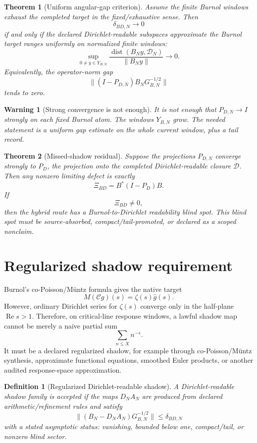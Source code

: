 \documentclass[11pt]{article}
\newtheorem{theorem}{Theorem}
\newtheorem{definition}{Definition}
\newtheorem{warning}{Warning}
\begin{document}
\begin{theorem}[Uniform angular-gap criterion]
Assume the finite Burnol windows exhaust the completed target in the fixed/exhaustive sense.  Then
\[
\delta_{BD,N}\to0
\]
if and only if the declared Dirichlet-readable subspaces approximate the Burnol target ranges uniformly on normalized finite windows:
\[
\sup_{0\ne y\in Y_{B,N}}
\frac{\operatorname{dist}(B_Ny,\mathcal D_N)}{\|B_Ny\|}
\to0.
\]
Equivalently, the operator-norm gap
\[
\|(I-P_{D,N})B_NG_{B,N}^{-1/2}\|
\]
tends to zero.
\end{theorem}

\begin{warning}[Strong convergence is not enough]
It is not enough that $P_{D,N}\to I$ strongly on each fixed Burnol atom.  The windows $Y_{B,N}$ grow.  The needed statement is a uniform gap estimate on the whole current window, plus a tail record.
\end{warning}

\begin{theorem}[Missed-shadow residual]
Suppose the projections $P_{D,N}$ converge strongly to $P_D$, the projection onto the completed Dirichlet-readable closure $\mathcal D$.  Then any nonzero limiting defect is exactly
\[
\Xi_{BD}=B^*(I-P_D)B.
\]
If
\[
\Xi_{BD}\ne0,
\]
then the hybrid route has a Burnol-to-Dirichlet readability blind spot.  This blind spot must be source-absorbed, compact/tail-promoted, or declared as a scoped nonclaim.
\end{theorem}

\section{Regularized shadow requirement}
Burnol's co-Poisson/Müntz formula gives the native target
\[
M(\mathcal Cg)(s)=\zeta(s)\widehat g(s).
\]
However, ordinary Dirichlet series for $\zeta(s)$ converge only in the half-plane $\operatorname{Re}s>1$.  Therefore, on critical-line response windows, a lawful shadow map cannot be merely a naive partial sum
\[
\sum_{n\le X}n^{-s}.
\]
It must be a declared regularized shadow, for example through co-Poisson/Müntz synthesis, approximate functional equations, smoothed Euler products, or another audited response-space approximation.

\begin{definition}[Regularized Dirichlet-readable shadow]
A Dirichlet-readable shadow family is accepted if the maps $D_NA_N$ are produced from declared arithmetic/refinement rules and satisfy
\[
\|(B_N-D_NA_N)G_{B,N}^{-1/2}\|\le \delta_{BD,N}
\]
with a stated asymptotic status: vanishing, bounded below one, compact/tail, or nonzero blind sector.
\end{definition}
\end{document}
